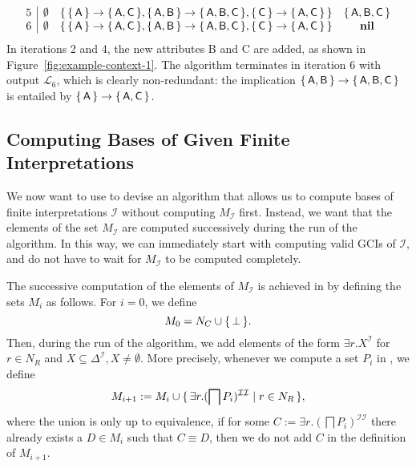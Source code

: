 \begin{Example}
\begin{equation*}
\begin{array}{c|ccc}
      5 & \emptyset      & {\{\,{\{\,\mathsf{A}\,\}} \to {\ensuremath{\{\,\mathsf{A},\mathsf{C}\,\}}},
        {\{\,\mathsf{A},\mathsf{B}\,\}} \to {\ensuremath{\{\,\mathsf{A}, \mathsf{B}, \mathsf{C}\,\}}}, {\{\,\mathsf{C}\,\}} \to
        {\ensuremath{\{\,\mathsf{A},\mathsf{C}\,\}}}\,\}} & {\{\,\mathsf{A}, \mathsf{B}, \mathsf{C}\,\}}\\
      6 & \emptyset & {\{\,{\{\,\mathsf{A}\,\}} \to {\ensuremath{\{\,\mathsf{A},\mathsf{C}\,\}}},
        {\{\,\mathsf{A},\mathsf{B}\,\}} \to {\ensuremath{\{\,\mathsf{A}, \mathsf{B}, \mathsf{C}\,\}}}, {\{\,\mathsf{C}\,\}} \to
        {\ensuremath{\{\,\mathsf{A},\mathsf{C}\,\}}}\,\}} & \text{\textbf{nil}}
    \end{array}
  \end{equation*}
  In iterations 2 and 4, the new attributes B and C are added, as shown in
  Figure~\ref{fig:example-context-1}.  The algorithm terminates in iteration 6 with output
  $\mathcal{L}_6$, which is clearly non-redundant: the implication ${\{\,\mathsf{A},
    \mathsf{B}\,\}} \to {\ensuremath{\{\,\mathsf{A}, \mathsf{B}, \mathsf{C}\,\}}}$ is entailed by
  ${\{\,\mathsf{A}\,\}} \to {\ensuremath{\{\,\mathsf{A}, \mathsf{C}\,\}}}$.
\end{Example}

\subsection{Computing Bases of Given Finite Interpretations}
\label{sec:comp-bases-given}

We now want to use  to devise an algorithm that
allows us to compute bases of finite interpretations $\mathcal{I}$ without computing
$M_{\mathcal{I}}$ first.  Instead, we want that the elements of the set $M_{\mathcal{I}}$
are computed successively during the run of the algorithm.  In this way, we can
immediately start with computing valid GCIs of $\mathcal{I}$, and do not have to wait for
$M_{\mathcal{I}}$ to be computed completely.

The successive computation of the elements of $M_{\mathcal{I}}$ is achieved in
 by defining the sets $M_{i}$ as follows.  For $i
= 0$, we define
\begin{equation*}
  M_{0} = N_{C} \cup {\ensuremath{\{\, \bot \,\}}}.
\end{equation*}
Then, during the run of the algorithm, we add elements of the form $\exists
r. X^{\mathcal{I}}$ for $r \in N_{R}$ and $X \subseteq \Delta^{\mathcal{I}}, X \neq
\emptyset$.  More precisely, whenever we compute a set $P_{i}$ in
, we define
\begin{equation*}
  M_{i+1} := M_{i} \cup {\ensuremath{\{\, \exists r. (\bigsqcap P_{i})^{\mathcal{I}\mathcal{I}} \mid r
    \in N_{R} \,\}}},
\end{equation*}
where the union is only up to equivalence, \ie if for some $C:= \exists r. (\bigsqcap
P_{i})^{\mathcal{I}\mathcal{I}}$ there already exists a $D \in M_{i}$ such that $C \equiv
D$, then we do not add $C$ in the definition of $M_{i+1}$.

